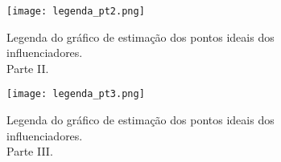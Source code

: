 \documentclass[
	12pt,				%
	openright,			%
	twoside,			%
	a4paper,			%
	english,			%
	brazil				%
	]{abntex2}
\begin{document}
\begin{anexosenv}
 \begin{figure}[!htbp]
    \centering
    \texttt{[image: legenda\_pt2.png]}
    \caption{Legenda do gráfico de estimação dos pontos ideais dos influenciadores.\\ Parte II.}
    \label{leg3}
 \end{figure}

 \begin{figure}[!htbp]
    \centering
    \texttt{[image: legenda\_pt3.png]}
    \caption{Legenda do gráfico de estimação dos pontos ideais dos influenciadores.\\ Parte III.}
    \label{leg3}
 \end{figure}
 




\end{anexosenv}

 
 
\printindex
\end{document}
